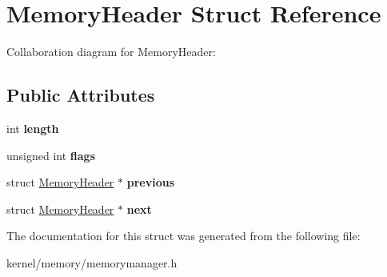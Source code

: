 \hypertarget{structMemoryHeader}{}\section{Memory\+Header Struct Reference}
\label{structMemoryHeader}


Collaboration diagram for Memory\+Header\+:
\subsection*{Public Attributes}
\begin{DoxyCompactItemize}
\item 
int {\bfseries length}\hypertarget{structMemoryHeader_a0a3b8fa8771e6600757423ec3d1eba65}{}\label{structMemoryHeader_a0a3b8fa8771e6600757423ec3d1eba65}

\item 
unsigned int {\bfseries flags}\hypertarget{structMemoryHeader_a156a11c1dca4fa49d7dc9fc3984629c5}{}\label{structMemoryHeader_a156a11c1dca4fa49d7dc9fc3984629c5}

\item 
struct \hyperlink{structMemoryHeader}{Memory\+Header} $\ast$ {\bfseries previous}\hypertarget{structMemoryHeader_aeacdc99cd7794ef68ce94de250b5a1a6}{}\label{structMemoryHeader_aeacdc99cd7794ef68ce94de250b5a1a6}

\item 
struct \hyperlink{structMemoryHeader}{Memory\+Header} $\ast$ {\bfseries next}\hypertarget{structMemoryHeader_ad5511d8562e52104a8edcf1b448a9748}{}\label{structMemoryHeader_ad5511d8562e52104a8edcf1b448a9748}

\end{DoxyCompactItemize}


The documentation for this struct was generated from the following file\+:\begin{DoxyCompactItemize}
\item 
kernel/memory/memorymanager.\+h\end{DoxyCompactItemize}
